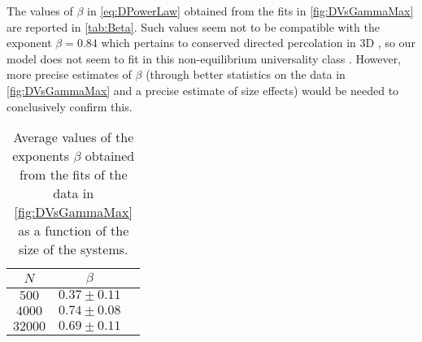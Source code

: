The values of $\beta$ in \autoref{eq:DPowerLaw} obtained from the fits in \autoref{fig:DVsGammaMax} are reported in \autoref{tab:Beta}. Such values seem not to be compatible with the exponent $\beta = 0.84$ which pertains to conserved directed percolation in 3D \cite{menon2009universality}, so our model does not seem to fit in this non-equilibrium universality class \cite{hinrichsen2000nonequilibrium}. However, more precise estimates of $\beta$ (through better statistics on the data in \autoref{fig:DVsGammaMax} and a precise estimate of size effects) would be needed to conclusively confirm this.

\begin{table}
	\centering
	\begin{tabular}{| c | c | c |}
		$N$ & $\beta$ \\
		\hline 
		$500$ & $0.37 \pm 0.11$ \\
		$4000$ & $0.74 \pm 0.08$ \\
		$32000$ & $0.69 \pm 0.11$ \\
		\hline 
	\end{tabular}
	\caption{Average values of the exponents $\beta$ obtained from the fits of the data in \autoref{fig:DVsGammaMax} as a function of the size of the systems. \label{tab:Beta}}
\end{table}

